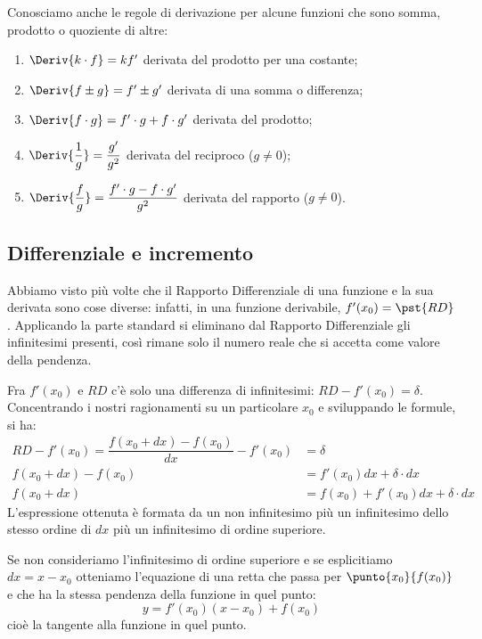 Conosciamo anche le regole di derivazione per alcune funzioni che sono 
somma, prodotto o quoziente di altre:
\begin{enumerate} [noitemsep]
\item \(\Deriv{k\cdot f}=kf'\) \tab 
derivata del prodotto per una costante;
\item \(\Deriv{f\pm g}=f'\pm g'\) \tab 
derivata di una somma o differenza;
\item \(\Deriv{f\cdot g}= f'\cdot g+f\cdot g'\) \tab 
derivata del prodotto;
\item \(\Deriv{\dfrac{1}{g}}=\dfrac{g'}{g^2}\)\tab 
derivata  del reciproco (\(g \ne 0\));
\item \(\Deriv{\dfrac{f}{g}}=\dfrac{f'\cdot 
g-f\cdot g'}{g^2}\)\tab 
derivata  del rapporto (\(g \ne 0\)).
\end{enumerate}

\subsection{Differenziale e incremento}
\label{subsec:differenziazione_diff_inc}
Abbiamo visto più volte che il Rapporto Differenziale di una funzione e la 
sua derivata sono cose diverse: infatti, in una funzione derivabile,
\(f'(x_0)=\pst{RD}\). Applicando la parte standard si eliminano dal Rapporto 
Differenziale gli infinitesimi presenti, così rimane solo il 
numero reale che si accetta come valore della pendenza.

Fra \(f'(x_0)\) e \(RD\) c'è solo una differenza di infinitesimi:
\(RD-f'(x_0)=\delta\). 
Concentrando i nostri ragionamenti su un particolare \(x_0\) e sviluppando le 
formule, si ha:
\begin{align*}
RD-f'(x_0)=\dfrac{f(x_0+dx) -f(x_0)}{dx} -f'(x_0) &= \delta \\
f(x_0+dx)-f(x_0) &= f'(x_0)dx +\delta\cdot dx \\
f(x_0+dx) &= f(x_0) +f'(x_0)dx +\delta\cdot dx
\end{align*}
L'espressione ottenuta è formata da un non infinitesimo più un infinitesimo 
dello stesso ordine di \(dx\) più un infinitesimo di ordine superiore.

Se non consideriamo l'infinitesimo di ordine superiore e se esplicitiamo 
\(dx = x -x_0\) otteniamo l'equazione di una retta che passa per 
\(\punto{x_0}{f(x_0)}\) e che ha la stessa pendenza della funzione in quel 
punto:
\[y = f'(x_0)(x -x_0) +f(x_0)\]
cioè la tangente alla funzione in quel punto.

